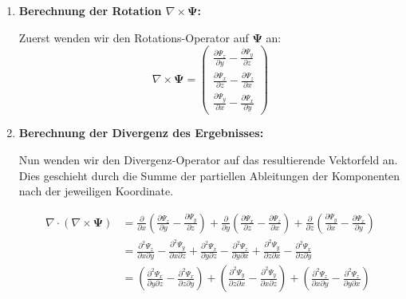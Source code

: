 \begin{enumerate}
    \item \textbf{Berechnung der Rotation $\nabla \times \mathbf{\Psi}$:}
    
    Zuerst wenden wir den Rotations-Operator auf $\mathbf{\Psi}$ an:
    \[
    \nabla \times \mathbf{\Psi} =
    \begin{pmatrix}
        \frac{\partial \Psi_z}{\partial y} - \frac{\partial \Psi_y}{\partial z} \\
        \frac{\partial \Psi_x}{\partial z} - \frac{\partial \Psi_z}{\partial x} \\
        \frac{\partial \Psi_y}{\partial x} - \frac{\partial \Psi_x}{\partial y}
    \end{pmatrix}
    \]

    \item \textbf{Berechnung der Divergenz des Ergebnisses:}
    
    Nun wenden wir den Divergenz-Operator auf das resultierende Vektorfeld an. Dies geschieht durch die Summe der partiellen Ableitungen der Komponenten nach der jeweiligen Koordinate.
    
    \begin{align*}
    \nabla \cdot (\nabla \times \mathbf{\Psi}) &= \frac{\partial}{\partial x}\left( \frac{\partial \Psi_z}{\partial y} - \frac{\partial \Psi_y}{\partial z} \right) + \frac{\partial}{\partial y}\left( \frac{\partial \Psi_x}{\partial z} - \frac{\partial \Psi_z}{\partial x} \right) + \frac{\partial}{\partial z}\left( \frac{\partial \Psi_y}{\partial x} - \frac{\partial \Psi_x}{\partial y} \right) \\[1em]
    &= \frac{\partial^2 \Psi_z}{\partial x \partial y} - \frac{\partial^2 \Psi_y}{\partial x \partial z} + \frac{\partial^2 \Psi_x}{\partial y \partial z} - \frac{\partial^2 \Psi_z}{\partial y \partial x} + \frac{\partial^2 \Psi_y}{\partial z \partial x} - \frac{\partial^2 \Psi_x}{\partial z \partial y} \\[1em]
    &= \left( \frac{\partial^2 \Psi_x}{\partial y \partial z} - \frac{\partial^2 \Psi_x}{\partial z \partial y} \right) + \left( \frac{\partial^2 \Psi_y}{\partial z \partial x} - \frac{\partial^2 \Psi_y}{\partial x \partial z} \right) + \left( \frac{\partial^2 \Psi_z}{\partial x \partial y} - \frac{\partial^2 \Psi_z}{\partial y \partial x} \right)
    \end{align*}
    

\end{enumerate}
